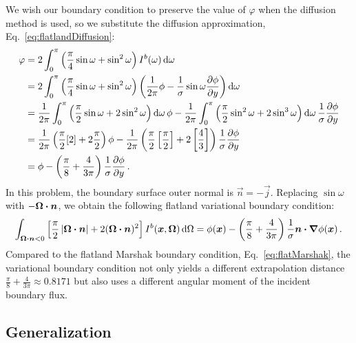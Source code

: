 We wish our boundary condition to preserve the value of
$\varphi$ when the diffusion method is used, so we substitute the diffusion
approximation, Eq.~\eqref{eq:flatlandDiffusion}:
\begin{align*}
 \varphi &= 2\int_{0}^{\pi} \left( \frac{\pi}{4} \sin\omega + \sin^2\omega \right)
 I^b(\omega) \mathop{}\!\mathrm{d}\omega
 \\
 &= 
  2\int_{0}^{\pi} \left( \frac{\pi}{4} \sin\omega + \sin^2\omega \right)
 \left( \frac{1}{2\pi} \phi -
  \frac{1}{\sigma} \sin\omega \frac{\partial \phi}{\partial y}\right)\mathop{}\!\mathrm{d}\omega
\\
 &= 
\frac{1}{2\pi} \int_{0}^{\pi} \left( \frac{\pi}{2} \sin\omega + 2 \sin^2\omega
\right)\mathop{}\!\mathrm{d}\omega
 \,\phi -
 \frac{1}{2\pi} \int_{0}^{\pi} \left( \frac{\pi}{2} \sin^2\omega + 2 \sin^3\omega \right)\mathop{}\!\mathrm{d}\omega
  \,\frac{1}{\sigma} \frac{\partial \phi}{\partial y}
  \\
 &= 
 \frac{1}{2\pi} \left( \frac{\pi}{2} [2] + 2 \frac{\pi}{2}
\right) \phi
-
\frac{1}{2\pi} \left( \frac{\pi}{2} \left[ \frac{\pi}{2} \right] + 2 \left[
\frac{4}{3} \right] \right) \frac{1}{\sigma} \frac{\partial \phi}{\partial y}
\\
 &= 
  \phi
- \left( \frac{\pi}{8} + \frac{4}{3\pi} \right) \frac{1}{\sigma} \frac{\partial \phi}{\partial y}
\,.
\end{align*}
In this problem, the boundary surface outer normal is $\vec{n}=-\vec{j}$. 
Replacing $\sin \omega$ with $-\bm{\Omega}\bm{\cdot}\bm{n}$, we obtain the following
flatland variational boundary condition:
\begin{equation} \label{eq:flatVarBc}
\int_{\bm{\Omega}\bm{\cdot}\bm{n} < 0} \left[ \frac{\pi}{2}
\left| \bm{\Omega}\bm{\cdot}\bm{n} \right| + 2 (\bm{\Omega}\bm{\cdot}\bm{n})^2 \right]
I^b(\bm{x}, \bm{\Omega}) \mathop{}\!\mathrm{d}\Omega
= 
  \phi(\bm{x})
  - \left( \frac{\pi}{8} + \frac{4}{3\pi} \right) \frac{1}{\sigma}
  \bm{n}\bm{\cdot}\bm{\nabla} \phi(\bm{x})\,.
\end{equation}
Compared to the flatland Marshak boundary condition,
Eq.~\eqref{eq:flatMarshak}, the variational boundary condition not only yields a
different extrapolation distance $\frac{\pi}{8} + \frac{4}{3\pi} \approx
0.8171$ but also uses a different angular moment of the incident boundary flux.

\subsection{Generalization}\label{sec:flatlandV}

